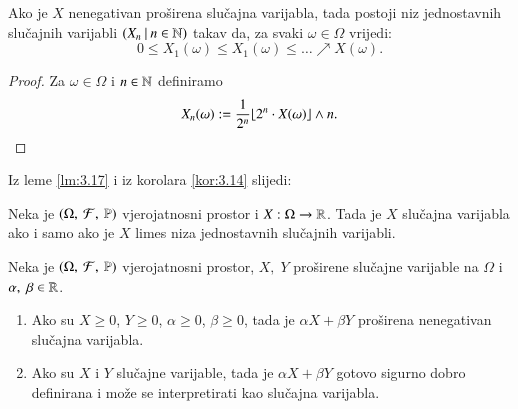 \begin{lm}  \label{lm:3.17}
    Ako je $X$ nenegativan pro\v sirena slu\v cajna varijabla, tada postoji niz jednostavnih slu\v cajnih varijabli $({X_n} \: | \: {n \in \mathbb{N}})$ takav da, za svaki $\omega \in \Omega$ vrijedi:
    \begin{equation*}
        0 \leq X_1(\omega) \leq X_1(\omega) \leq  \dots \nearrow X(\omega).
    \end{equation*} 
\end{lm}

\begin{proof}
    Za $\omega \in \Omega$ i $n \in \mathbb{N}$ definiramo
    \begin{equation*}
        X_n(\omega) := \frac{1}{2^n} \floor*{2^n \cdot X(\omega)} \land n.
    \end{equation*}
\end{proof}

Iz leme \ref{lm:3.17} i iz korolara \ref{kor:3.14} slijedi:

\begin{tm}  \label{tm:3.18}
    Neka je $(\Omega, \: \mathcal{F}, \: \mathbb{P})$ vjerojatnosni prostor i $X: \Omega \to \mathbb{R}$. Tada je $X$ slu\v cajna varijabla ako i samo ako je $X$ limes niza jednostavnih slu\v cajnih varijabli.
\end{tm}

\begin{zad} \label{zad:3.19}
    Neka je $(\Omega, \: \mathcal{F}, \: \mathbb{P})$ vjerojatnosni prostor, $X, \; Y$ pro\v sirene slu\v cajne varijable na $\Omega$ i $\alpha, \; \beta \in \mathbb{R}$.
    \begin{enumerate}[label=(\alph*)]
        \item Ako su $X \geq 0$, $Y \geq 0$, $\alpha \geq 0$, $\beta    \geq 0$, tada je $\alpha X + \beta Y$ pro\v sirena nenegativan slu\v cajna varijabla.
        \item Ako su $X$ i $Y$ slu\v cajne  varijable, tada je $\alpha X + \beta Y$ gotovo sigurno dobro definirana i mo\v ze se interpretirati kao slu\v cajna varijabla.
    \end{enumerate}
\end{zad}


